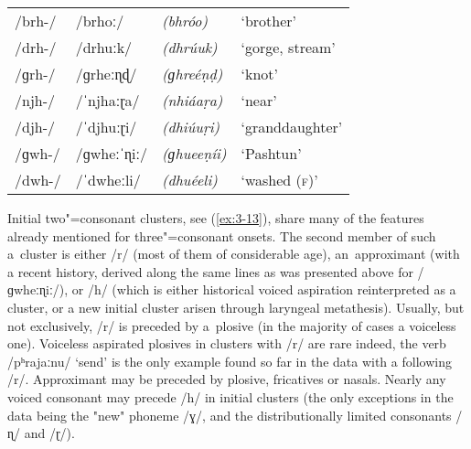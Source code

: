 \begin{exe}
\extab
\label{ex:3-12}
\begin{tabular}{ l l l l }
/brh-/ &
/brhoː/ &
\textit{(bhróo)} &
`brother'\\
/drh-/ &
/drhuːk/ &
\textit{(dhrúuk)} &
`gorge, stream' \\
/ɡrh-/ &
/ɡrheːɳɖ/ &
\textit{(ɡhreéṇḍ)} &
`knot' \\
/njh-/ &
/ˈnjhaːɽa/ &
\textit{(nhiáaṛa)} &
`near'\\
/djh-/ &
/ˈdjhuːɽi/ &
\textit{(dhiúuṛi)} &
`granddaughter'\\
/ɡwh-/ &
/ɡwheːˈɳiː/ &
\textit{(ɡhueeṇíi)} &
`Pashtun'\\
/dwh-/ &
/ˈdwheːli/ &
\textit{(dhuéeli)} &
`washed (\textsc{f)}'\\
\end{tabular}
\end{exe}


Initial two"=consonant clusters, see (\ref{ex:3-13}), share many of the features already mentioned for three"=consonant onsets. The second member of such a~cluster is either /r/ (most of them of considerable age), an~approximant (with a recent history, derived along the same lines as was presented above for /ɡwheːɳiː/), or /h/ (which is either historical voiced aspiration reinterpreted as a cluster, or a new initial cluster arisen through laryngeal metathesis). Usually, but not exclusively, /r/ is preceded by a~plosive (in the majority of cases a voiceless one). Voiceless aspirated plosives in clusters with /r/ are rare indeed, the verb /pʰrajaːnu/ `send' is the only example found so far in the data with a following /r/. Approximant may be preceded by plosive, fricatives or nasals. Nearly any voiced consonant may precede /h/ in initial clusters (the only exceptions in the data being the "new" phoneme /ɣ/, and the distributionally limited consonants /ɳ/ and /ɽ/).



